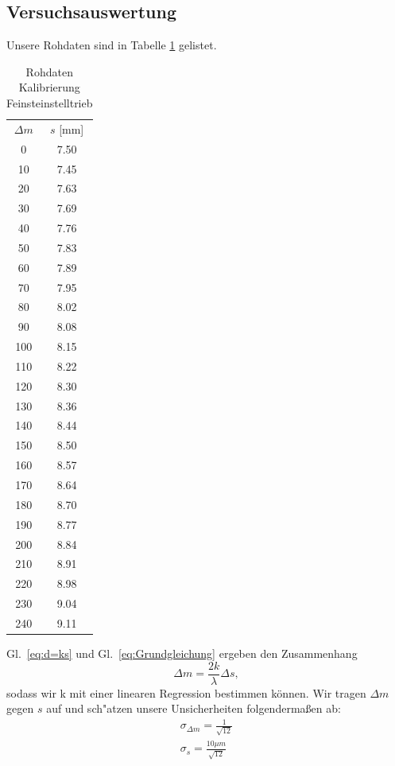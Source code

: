 \documentclass[12pt,a4paper]{article}
\begin{document}
\subsection{Versuchsauswertung}
Unsere Rohdaten sind in Tabelle \ref{table:RohdatenKalibrierung} gelistet.
\begin{table}[H]
	\centering
	\begin{tabular}{|c|c|}
		\hline
		$\Delta m$&$s$ [mm]\\
		0&7.50\\
		10&7.45\\
		20&7.63\\
		30&7.69\\
		40&7.76\\
		50&7.83\\
		60&7.89\\
		70&7.95\\
		80&8.02\\
		90&8.08\\
		100&8.15\\
		110&8.22\\
		120&8.30\\
		130&8.36\\
		140&8.44\\
		150&8.50\\
		160&8.57\\
		170&8.64\\
		180&8.70\\
		190&8.77\\
		200&8.84\\
		210&8.91\\
		220&8.98\\
		230&9.04\\
		240&9.11\\
		\hline
	\end{tabular}
	\caption{Rohdaten Kalibrierung Feinsteinstelltrieb}
	\label{table:RohdatenKalibrierung}
\end{table}
Gl.~\eqref{eq:d=ks} und Gl.~\eqref{eq:Grundgleichung} ergeben den Zusammenhang
\begin{equation}
\Delta m = \frac{2k}{\lambda}\Delta s,
\end{equation}
sodass wir k mit einer linearen Regression bestimmen können. Wir tragen $\Delta m$ gegen $s$ auf und sch"atzen unsere Unsicherheiten folgendermaßen ab:
\begin{align}\label{eq:Unsicherheit_Kalibrierung}
\sigma_{\Delta m}=\frac{1}{\sqrt{12}}\\
\sigma_s=\frac{10\mu m}{\sqrt{12}}
\end{align}
\end{document}
